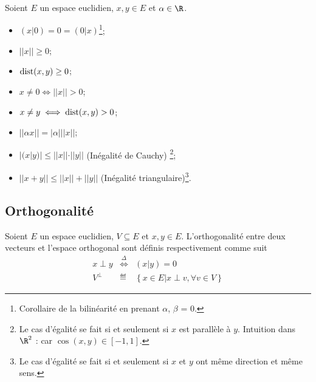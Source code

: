 \begin{myprop}
	Soient $E$ un espace euclidien, $x,y \in E$ et $\alpha \in \R$.
	\begin{itemize}
		\item $(x|0) = 0 = (0|x)$\footnote{Corollaire de la bilinéarité en prenant $\alpha$, $\beta$ = 0.};
		\item $||x|| \geq 0$;
		\item $\operatorname{dist}(x, y) \geq 0$;
		\item $x \neq 0 \iff ||x|| > 0$;
		\item $x \neq y \iff \operatorname{dist}(x, y) > 0$;
		\item $||\alpha x|| = |\alpha|||x||$;
		\item $|(x | y)| \leq ||x||\cdot||y||$ (Inégalité de Cauchy)
			\footnote{Le cas d'égalité se fait si et seulement si $x$ est parallèle à $y$. Intuition dans $\R^2$ : car $\cos (x,y) \in [-1,1]$.};
		\item $||x + y|| \leq ||x|| + ||y||$ (Inégalité triangulaire)\footnote{Le cas d'égalité se fait si et seulement si $x$ et $y$ ont même direction et même sens.}.
	\end{itemize}
\end{myprop}

\subsection{Orthogonalité}

\begin{mydef}
	Soient $E$ un espace euclidien, $V \subseteq E$ et $x,y \in E$.
	L'orthogonalité entre deux vecteurs et l'espace orthogonal sont définis respectivement comme suit
	\begin{eqnarray*}
		x \perp y & \stackrel{\Delta}{\Leftrightarrow} & (x|y) = 0\\
		V^{\perp} & \eqdef & \left\{x \in E | x \perp v, \forall v \in V\right\}
	\end{eqnarray*}
\end{mydef}

